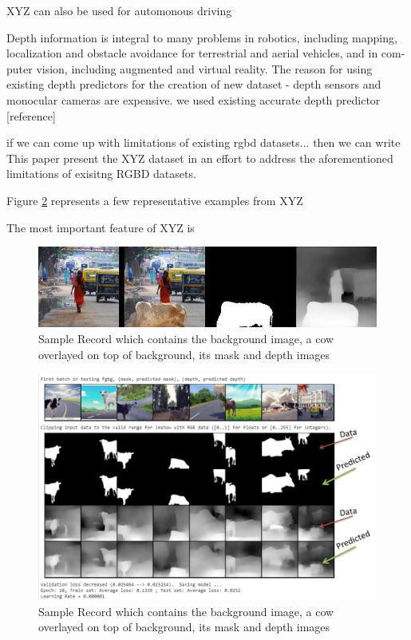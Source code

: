 \documentclass{article}
\begin{document}
XYZ can also be used for automonous driving


Depth information is integral to many problems in
robotics, including mapping, localization and obstacle avoidance for terrestrial and aerial vehicles, and in com- puter vision, including augmented and virtual reality\cite{marchand2015pose}.
The reason for using existing depth predictors for the creation of new dataset - depth sensors and monocular cameras are expensive. we used existing accurate depth predictor [reference]

if we can come up with limitations of existing rgbd datasets... then we can write This paper present the XYZ dataset in an effort to address the aforementioned limitations of exisitng RGBD datasets.

Figure \ref{fig:samplerecord} represents a few representative examples from XYZ

The most important feature of XYZ is 

\begin{figure}[h!]
\centering
  \includegraphics[width=1\textwidth]{samplerecord.png}
  \caption{Sample Record which contains the background image, a cow overlayed on top of background, its mask and depth images}
  \label{fig:samplerecord}
\end{figure}


\begin{figure}[h!]
\centering
  \includegraphics[width=1\textwidth]{finalepoch.png}
  \caption{Sample Record which contains the background image, a cow overlayed on top of background, its mask and depth images}
  \label{fig:samplerecord}
\end{figure}
\end{document}
